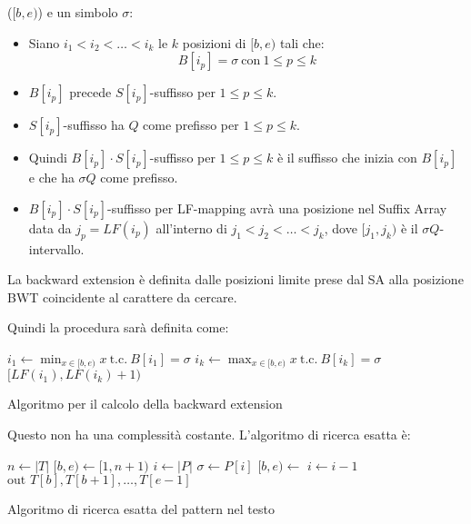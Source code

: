 ($[b, e)$) e un simbolo $\sigma$:
\begin{itemize}
    \item Siano $i_1 < i_2 < \dots < i_k$ le $k$ posizioni di $[b,e)$ tali che:
          \begin{equation}
              B[i_p] = \sigma \ \text{con} \ 1 \leq p \leq k
          \end{equation}
    \item $B[i_p]$ precede $S[i_p]$-suffisso per $1 \leq p \leq k$.
    \item $S[i_p]$-suffisso ha $Q$ come prefisso per $1 \leq p \leq k$.
    \item Quindi $B[i_p] \cdot S[i_p]$-suffisso per $1\le p \le k$ è il suffisso
          che inizia con $B[i_p]$ e che ha $\sigma Q$ come prefisso.
    \item $B[i_p] \cdot S[i_p]$-suffisso per LF-mapping avrà una posizione
          nel Suffix Array data da $j_p = LF(i_p)$ all'interno di $j_1 < j_2 <
              \dots < j_k$, dove $[j_1,j_k)$ è il $\sigma Q$-intervallo.
\end{itemize}
\begin{nota}
    La backward extension è definita dalle posizioni limite prese dal SA alla
    posizione BWT coincidente al carattere da cercare.
\end{nota}
Quindi la procedura sarà definita come:
\begin{algorithm}
    \begin{algorithmic}
        \State $i_1 \gets \min_{x\in [b,e)} x \ \text{t.c.} \ B[i_1] = \sigma$
        \State $i_k \gets \max_{x\in [b,e)} x \ \text{t.c.} \ B[i_k] = \sigma$
        \State \Return $[LF(i_1), LF(i_k)+1)$
        \EndFunction
    \end{algorithmic}
    \caption{Algoritmo per il calcolo della backward extension}
\end{algorithm}

Questo non ha una complessità costante. L'algoritmo di ricerca esatta è:
\begin{algorithm}
    \begin{algorithmic}
        \State $n \gets |T|$
        \State $[b,e) \gets [1, n+1)$
        \State $i \gets |P|$
        \While{$[b,e) \ \neq \ \text{null}\land i\ge 1$}
        \State $\sigma \gets P[i]$
        \State $[b,e) \gets$
        \State $i\gets i-1$
        \EndWhile
        \If{$[b,e)\ \neq \ \text{null}$}
        \State $\text{out } T[b], T[b+1], \dots, T[e-1]$
        \EndIf
        \EndFunction
    \end{algorithmic}
    \caption{Algoritmo di ricerca esatta del pattern nel testo}
\end{algorithm}

